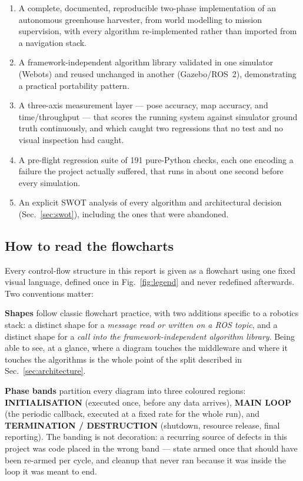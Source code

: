 \begin{enumerate}[leftmargin=*,itemsep=1pt,topsep=2pt]
  \item A complete, documented, reproducible two-phase implementation of
        an autonomous greenhouse harvester, from world modelling to
        mission supervision, with every algorithm re-implemented rather
        than imported from a navigation stack.
  \item A framework-independent algorithm library validated in one
        simulator (Webots) and reused unchanged in another
        (Gazebo/ROS~2), demonstrating a practical portability pattern.
  \item A three-axis measurement layer --- pose accuracy, map accuracy,
        and time/throughput --- that scores the running system against
        simulator ground truth continuously, and which caught two
        regressions that no test and no visual inspection had caught.
  \item A pre-flight regression suite of 191 pure-Python checks, each
        one encoding a failure the project actually suffered, that runs
        in about one second before every simulation.
  \item An explicit SWOT analysis of every algorithm and architectural
        decision (Sec.~\ref{sec:swot}), including the ones that were
        abandoned.
\end{enumerate}

\subsection{How to read the flowcharts}

Every control-flow structure in this report is given as a flowchart
using one fixed visual language, defined once in
Fig.~\ref{fig:legend} and never redefined afterwards. Two conventions
matter:

\textbf{Shapes} follow classic flowchart practice, with two additions
specific to a robotics stack: a distinct shape for a \emph{message
read or written on a ROS topic}, and a distinct shape for a \emph{call
into the framework-independent algorithm library}. Being able to see, at
a glance, where a diagram touches the middleware and where it touches
the algorithms is the whole point of the split described in
Sec.~\ref{sec:architecture}.

\textbf{Phase bands} partition every diagram into three coloured
regions: \textcolor{phaseInitLine}{\textbf{INITIALISATION}} (executed
once, before any data arrives), \textcolor{phaseMainLine}{\textbf{MAIN
LOOP}} (the periodic callback, executed at a fixed rate for the whole
run), and \textcolor{phaseEndLine}{\textbf{TERMINATION / DESTRUCTION}}
(shutdown, resource release, final reporting). The banding is not
decoration: a recurring source of defects in this project was code
placed in the wrong band --- state armed once that should have been
re-armed per cycle, and cleanup that never ran because it was inside the
loop it was meant to end.

